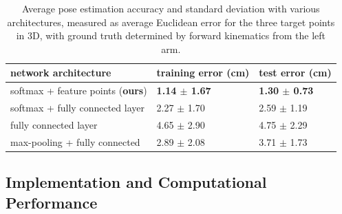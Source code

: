 \documentclass[final]{IEEEtran}
\begin{document}
\begin{table}[h!]
  \begin{center}
    \begin{tabular}{| l | l | l | }
    \hline
    network architecture & training error (cm) & test error (cm)  \\
    \hline
    softmax + feature points ({\bf ours}) & {\bf 1.14 $\pm$ 1.67}  & {\bf 1.30 $\pm$ 0.73} \\
    \hline
    softmax + fully connected layer & 2.27 $\pm$ 1.70 & 2.59 $\pm$ 1.19 \\
    \hline
    fully connected layer & 4.65 $\pm$ 2.90  & 4.75 $\pm$ 2.29  \\
    \hline
    max-pooling + fully connected & 2.89 $\pm$ 2.08 & 3.71 $\pm$ 1.73 \\
    \hline
    \end{tabular}
  \end{center}
\vspace{-0.1in}
  \caption{Average pose estimation accuracy and standard deviation with various architectures, measured as average Euclidean error for the three target points in 3D, with ground truth determined by forward kinematics from the left arm.
}
  \label{tbl:posebaseline}
\vspace{-0.05in}
\end{table}

\subsection{Implementation and Computational Performance}
\end{document}
